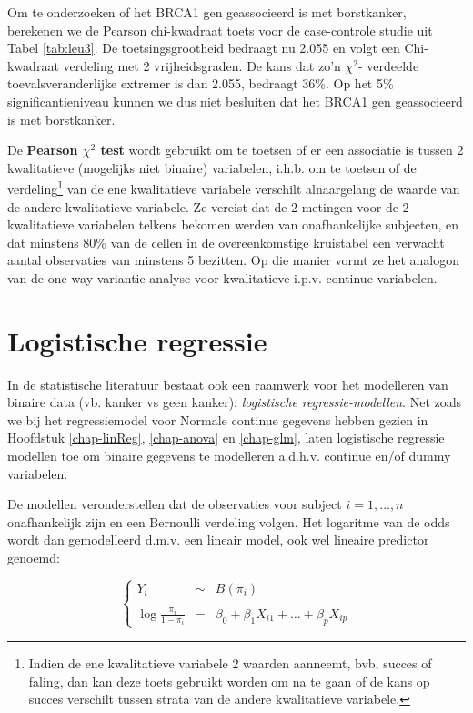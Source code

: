 \documentclass[
  12pt,dutch,coursenotes]{book}
\theoremstyle{definition}
\theoremstyle{definition}
\theoremstyle{definition}
\theoremstyle{definition}
\theoremstyle{remark}
\begin{document}
Om te onderzoeken of het BRCA1 gen geassocieerd is met borstkanker, berekenen we de Pearson chi-kwadraat toets voor de case-controle studie uit Tabel \ref{tab:leu3}. De toetsingsgrootheid bedraagt nu 2.055 en volgt een Chi-kwadraat verdeling met 2 vrijheidsgraden. De kans dat zo'n \(\chi^2\)- verdeelde toevalsveranderlijke extremer is dan 2.055, bedraagt 36\%.
Op het 5\% significantieniveau kunnen we dus niet besluiten dat het BRCA1 gen geassocieerd is met borstkanker.

De \textbf{Pearson \(\chi^2\) test} wordt gebruikt om te toetsen of er een associatie is tussen 2 kwalitatieve (mogelijks niet binaire) variabelen, i.h.b. om te toetsen of de verdeling\footnote{Indien de ene kwalitatieve variabele 2 waarden aanneemt, bvb, succes of faling, dan kan deze toets gebruikt worden om na te gaan of de kans op succes verschilt tussen strata van de andere kwalitatieve variabele.} van de ene kwalitatieve variabele verschilt alnaargelang de waarde van de andere kwalitatieve variabele. Ze vereist dat de 2 metingen voor de 2 kwalitatieve variabelen telkens bekomen werden van onafhankelijke subjecten, en dat minstens 80\% van de cellen in de overeenkomstige kruistabel een verwacht aantal observaties van minstens 5 bezitten. Op die manier vormt ze het analogon van de one-way variantie-analyse voor kwalitatieve i.p.v. continue variabelen.

\hypertarget{logistische-regressie}{%
\section{Logistische regressie}\label{logistische-regressie}}

In de statistische literatuur bestaat ook een raamwerk voor het modelleren van binaire data (vb. kanker vs geen kanker): \emph{logistische regressie-modellen}.
Net zoals we bij het regressiemodel voor Normale continue gegevens hebben gezien in Hoofdstuk \ref{chap-linReg}, \ref{chap-anova} en \ref{chap-glm}, laten logistische regressie modellen toe om binaire gegevens te modelleren a.d.h.v. continue en/of dummy variabelen.

De modellen veronderstellen dat de observaties voor subject \(i=1,\ldots,n\) onafhankelijk zijn en een Bernoulli verdeling volgen. Het logaritme van de odds wordt dan gemodelleerd d.m.v. een lineair model, ook wel lineaire predictor genoemd:

\begin{equation}
\left\{
\begin{array}{ccl}
Y_i&\sim&B(\pi_i)\\\\
\log \frac{\pi_i}{1-\pi_i}&=&\beta_0 + \beta_1X_{i1} + \ldots + \beta_p X_{ip}
\end{array}\right.
\end{equation}
\end{document}

